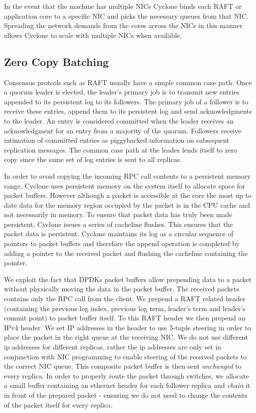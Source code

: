 \documentclass[letterpaper,twocolumn,10pt]{article}
\begin{document}
In the event that the machine has multiple NICs Cyclone binds each RAFT or
application core to a specific NIC and picks the necessary queues from that
NIC. Spreading the network demands from the cores across the NICs in this manner
allows Cyclone to scale with multiple NICs when available.

\subsection{Zero Copy Batching}
Consensus protcols such as RAFT usually have a simple common case path. Once a
quorum leader is elected, the leader's primary job is to transmit new entries
appended to its persistent log to its followers. The primary job of a follower
is to receive these entries, append them to its persistent log and send
acknowledgments to the leader. An entry is considered committed when the leader
receives an acknowledgment for an entry from a majority of the quorum. Followers
receive intimation of committed entries as piggybacked information on subsequent
replication messages. The common case path at the leader lends itself to zero
copy since the same set of log entries is sent to all replicas.

In order to avoid copying the incoming RPC call contents to a persistent memory
range, Cyclone uses persistent memory on the system itself to allocate space for
packet buffers. However although a packet is accessible at the core the most up
to date data for the memory region occupied by the packet is in the CPU cache
and not necessarily in memory. To ensure that packet data has truly been made
persistent, Cyclone issues a series of cacheline flushes. This ensures that the
packet data is persistent. Cyclone maintains its log as a circular sequence of
pointers to packet buffers and therefore the append operation is completed by
adding a pointer to the received packet and flushing the cacheline containing
the pointer.

We exploit the fact that DPDKs packet buffers allow prepending data to a packet
without physically moving the data in the packet buffer. The received packets
contains only the RPC call from the client. We prepend a RAFT related header
(containing the previous log index, previous log term, leader's term and
leader's commit point) to packet buffer itself. To this RAFT header we then
prepend an IPv4 header. We set IP addresses in the header to use 5-tuple
steering in order to place the packet in the right queue at the receiving
NIC. We do not use different ip addresses for different replicas, rather the ip
addresses are only set in conjunction with NIC programming to enable steering of
the received packets to the correct NIC queue.  This composite packet buffer is
then sent \emph{unchanged} to every replica. In order to properly route the
packet through switches, we allocate a small buffer containing an ethernet
header for each follower replica and \emph{chain} it in front of the prepared
packet - ensuring we do not need to change the contents of the packet itself for
every replica.
\end{document}
